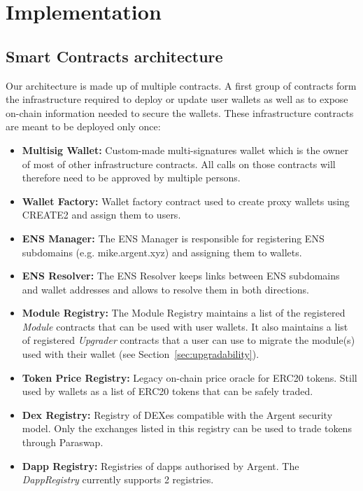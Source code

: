 \documentclass[12pt]{article}
\begin{document}
\section{Implementation}

\subsection{Smart Contracts architecture}


Our architecture is made up of multiple contracts. A first group of contracts form the infrastructure required to deploy or update user wallets as well as to expose on-chain information needed to secure the wallets. These infrastructure contracts are meant to be deployed only once:
\begin{itemize}
    \item \textbf{Multisig Wallet:} Custom-made multi-signatures wallet which is the owner of most of other infrastructure contracts. All calls on those contracts will therefore need to be approved by multiple persons.
    \item \textbf{Wallet Factory:} Wallet factory contract used to create proxy wallets using CREATE2 and assign them to users.
    \item \textbf{ENS Manager:} The ENS Manager is responsible for registering ENS subdomains (e.g. mike.argent.xyz) and assigning them to wallets.
    \item \textbf{ENS Resolver:} The ENS Resolver keeps links between ENS subdomains and wallet addresses and allows to resolve them in both directions.
    \item \textbf{Module Registry:} The Module Registry maintains a list of the registered \emph{Module} contracts that can be used with user wallets. It also maintains a list of registered \emph{Upgrader} contracts that a user can use to migrate the module(s) used with their wallet (see Section~\ref{sec:upgradability}).
    \item \textbf{Token Price Registry:} Legacy on-chain price oracle for ERC20 tokens. Still used by wallets as a list of ERC20 tokens that can be safely traded.  
    \item \textbf{Dex Registry:} Registry of DEXes compatible with the Argent security model. Only the exchanges listed in this registry can be used to trade tokens through Paraswap.
    \item \textbf{Dapp Registry:} Registries of dapps authorised by Argent. The \emph{DappRegistry} currently supports 2 registries.
\end{itemize}
\end{document}
